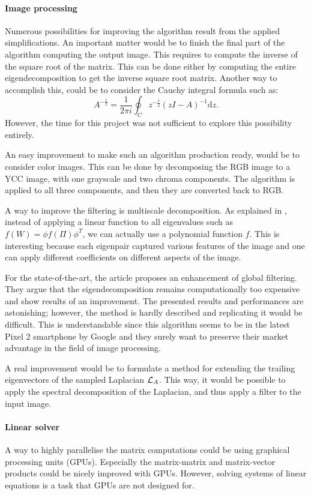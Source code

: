 \paragraph{Image processing}
Numerous possibilities for improving the algorithm result from the applied simplifications.
An important matter would be to finish the final part of the algorithm computing the output image.
This requires to compute the inverse of the square root of the matrix.
\ifthesis
 This can be done either by computing the entire eigendecomposition to get the inverse square root matrix.
 Another way to accomplish this, could be to consider the Cauchy integral formula such as:
 \[A^{-\frac{1}{2}} = \frac{1}{2\pi i} \oint_C z^{-\frac{1}{2}} (zI - A)^{-1} \mathrm{d}z.\]
 However, the time for this project was not sufficient to explore this possibility entirely.
\fi

\ifthesis
 An easy improvement to make such an algorithm production ready, would be to consider color images.
 This can be done by decomposing the RGB image to a YCC image, with one grayscale and two chroma components.
 The algorithm is applied to all three components, and then they are converted back to RGB.
\fi

A way to improve the filtering is multiscale decomposition.
As explained in \cite{talebi_nonlocal_2014}, instead of applying a linear function to all eigenvalues such as \(f(W) = \phi f(\Pi) \phi^T\), we can actually use a polynomial function \(f\).
This is interesting because each eigenpair captured various features of the image and one can apply different coefficients on different aspects of the image.

For the state-of-the-art, the article \cite{talebi_fast_2016} proposes an enhancement of global filtering.
They argue that the eigendecomposition remains computationally too expensive and show results of an improvement.
The presented results and performances are astonishing; however, the method is hardly described and replicating it would be difficult.
This is understandable since this algorithm seems to be in the latest Pixel 2 smartphone by Google and they surely want to preserve their market advantage in the field of image processing.

A real improvement would be to formulate a method for extending the trailing eigenvectors of the sampled Laplacian \(\operatorname{\mathcal{L}}_A\).
This way, it would be possible to apply the spectral decomposition of the Laplacian, and thus apply a filter to the input image.

\paragraph{Linear solver}
A way to highly parallelise the matrix computations could be using graphical processing units (GPUs).
Especially the matrix-matrix and matrix-vector products could be nicely improved with GPUs.
However, solving systems of linear equations is a task that GPUs are not designed for.

